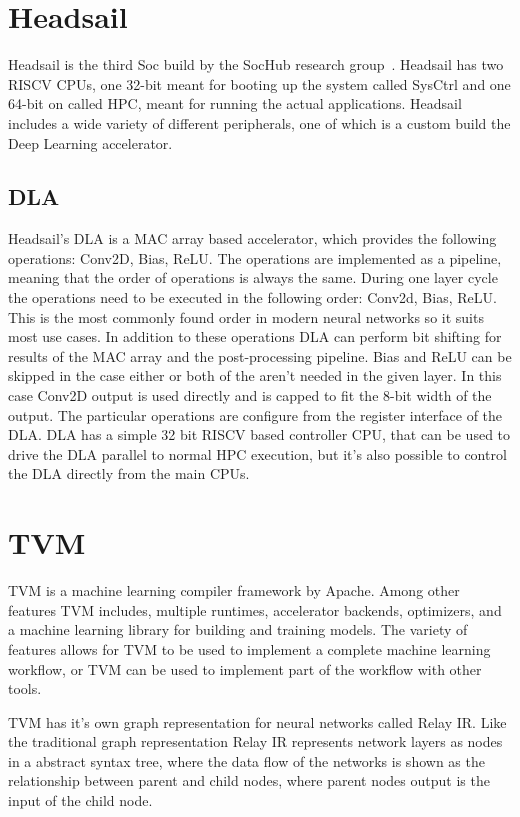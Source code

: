 \documentclass[12pt,a4paper,english
]{tunithesis}
\begin{document}
\section{Headsail}
Headsail is the third Soc build by the SocHub research group~\parencite{Ballast}. Headsail has two RISCV CPUs, one 32-bit meant for booting up the system called SysCtrl and one 64-bit on called HPC, meant for running the actual applications.
Headsail includes a wide variety of different peripherals, one of which is a custom build the Deep Learning accelerator.

\subsection{DLA}
Headsail's DLA is a MAC array based accelerator, which provides the following operations: Conv2D, Bias, ReLU. The operations are implemented as a pipeline, meaning that the order of operations is always the same. During one layer cycle the operations need to be executed in the following order: Conv2d, Bias, ReLU. This is the most commonly found order in modern neural networks so it suits most use cases. In addition to these operations DLA can perform bit shifting for results of the MAC array and the post-processing pipeline.
Bias and ReLU can be skipped in the case either or both of the aren't needed in the given layer. In this case Conv2D output is used directly and is capped to fit the 8-bit width of the output.
The particular operations are configure from the register interface of the DLA.
DLA has a simple 32 bit RISCV based controller CPU, that can be used to drive the DLA parallel to normal HPC execution, but it's also possible to control the DLA directly from the main CPUs.

\section{TVM}
TVM is a machine learning compiler framework by Apache. Among other features TVM includes, multiple runtimes, accelerator backends, optimizers, and a machine learning library for building and training models. The variety of features allows for TVM to be used to implement a complete machine learning workflow, or TVM can be used to implement part of the workflow with other tools.

TVM has it's own graph representation for neural networks called Relay IR. Like the traditional graph representation Relay IR represents network layers as nodes in a abstract syntax tree, where the data flow of the networks is shown as the relationship between parent and child nodes, where parent nodes output is the input of the child node.
\end{document}
